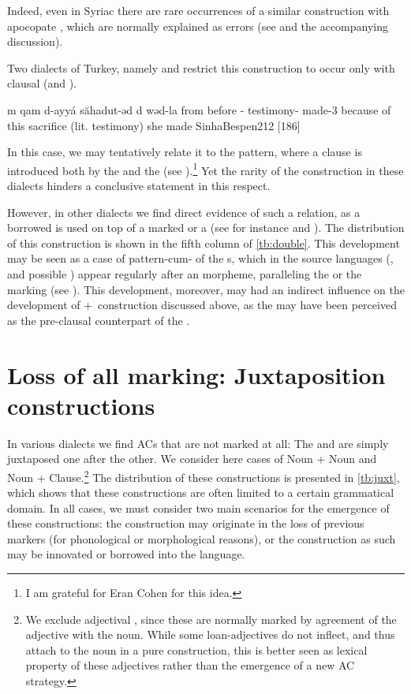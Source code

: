 Indeed, even in Syriac there are rare occurrences of a similar construction with apocopate \cst*, which are normally explained as errors (see  and the accompanying discussion). 

Two dialects of Turkey, namely \Bes and \Cal restrict this construction to occur only with  clausal \secns (\Bes and \Cal). 

{m\cb{} qam d-ayyá săhadut-əd d\cb{} wəd-la}
{from\cb{} before \gen-\dem{} testimony-\cst{} \lnk\cb{} made-3\fem}
{because of this sacrifice (lit. testimony) she made}
{SinhaBespen}{212 {[186]}}

\newpage 
In this case, we may tentatively relate it to the \Kur pattern, where a clause is introduced both by the \ez* and the \rel* (see ).\footnote{I am grateful for Eran Cohen for this idea.} Yet  the rarity of the construction in these dialects hinders a conclusive statement in this respect.   


However, in other dialects we find direct evidence of such a relation, as a borrowed \rel* is used on top of a \cst* marked \prim or a \lnk* (see for instance \Koy {} and \Sar {}). The distribution of this construction is shown in the fifth column of \vref{tb:double}. This development may be seen as a case of pattern-cum- of the \rel*s, which in the source languages (\Kur, \Sor and possible \Per) appear regularly after an \ez* morpheme, paralleling the \lnk* or the \cst* marking (see ). This development, moreover, may had an indirect influence on the development of \cst+\lnk\ construction discussed above, as the \rel* may have been perceived as the pre-clausal counterpart of the \lnk*. 

\section{Loss of all marking: Juxtaposition constructions} \label{ss:loss_marking}



In various dialects we find ACs that are not marked at all: The \prim and \secn are simply juxtaposed one after the other. We consider here cases of Noun + Noun and Noun + Clause.\footnote{We exclude adjectival \secns, since these are normally marked by agreement of the adjective with the \prim noun. While some loan-adjectives do not inflect, and thus attach to the noun in a pure  construction, this is better seen as lexical property of these adjectives rather than the emergence of a new AC strategy.} The distribution of these constructions is presented in \ref{tb:juxt}, which shows that these constructions are often limited to a certain grammatical domain.  In all cases, we must consider two main scenarios for the emergence of these constructions: the construction may originate in the loss of previous markers (for phonological or morphological reasons), or the construction as such may be innovated or borrowed into the language. 



